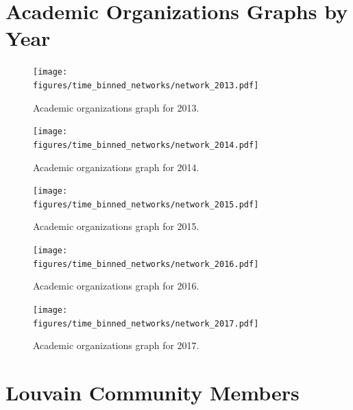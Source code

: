 \documentclass[notitlepage,aps,prd,nofootinbib]{revtex4-1}
\newcommand{\figures}{../outputs/plots}
\begin{document}
\begin{appendices}


\section{Academic Organizations Graphs by Year}
\label{appendix:graphs_by_year}

\begin{figure}[!htb]\centering
  \texttt{[image: \\figures/time\_binned\_networks/network\_2013.pdf]}
  \caption{Academic organizations graph for 2013.}
\end{figure}

\begin{figure}[!htb]\centering
  \texttt{[image: \\figures/time\_binned\_networks/network\_2014.pdf]}
  \caption{Academic organizations graph for 2014.}
\end{figure}

\begin{figure}[!htb]\centering
  \texttt{[image: \\figures/time\_binned\_networks/network\_2015.pdf]}
  \caption{Academic organizations graph for 2015.}
\end{figure}

\begin{figure}[!htb]\centering
  \texttt{[image: \\figures/time\_binned\_networks/network\_2016.pdf]}
  \caption{Academic organizations graph for 2016.}
\end{figure}

\begin{figure}[!htb]\centering
  \texttt{[image: \\figures/time\_binned\_networks/network\_2017.pdf]}
  \caption{Academic organizations graph for 2017.}
\end{figure}


\section{Louvain Community Members}
\label{appendix:community_members}


\end{appendices}
\end{document}
